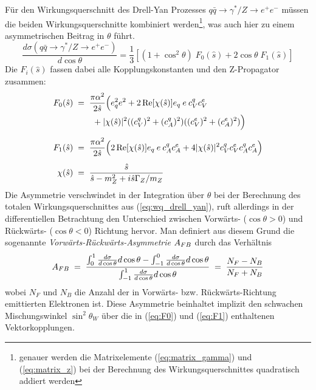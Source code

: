 Für den Wirkungsquerschnitt des Drell-Yan Prozesses $q\bar q \rightarrow
\gamma^*/Z \rightarrow e^+e^-$ müssen die beiden Wirkungsquerschnitte
kombiniert werden\footnote{genauer werden die Matrixelemente
(\ref{eq:matrix_gamma}) und (\ref{eq:matrix_z}) bei der Berechnung des
Wirkungsquerschnittes quadratisch addiert werden}, was auch hier zu einem 
asymmetrischen Beitrag in $\theta$ führt.
\begin{equation}
    \frac{d\sigma(q\bar q\rightarrow\gamma^*/Z\rightarrow e^+e^-)}{d\cos\theta}
        = \frac{1}{3}
          \left[
              (1+\cos^2\theta) \; F_0(\hat s)
              + 2\cos\theta \; F_1(\hat s)
          \right]
    \label{eq:wq_drell_yan}
\end{equation}
Die $F_i(\hat s)$ fassen dabei alle Kopplungskonstanten und den Z-Propagator
zusammen:
\begin{align}
    F_0(\hat s) \; &= \;
        \frac{\pi \alpha^2}{2 \hat s}
        \Bigl(
            e_q^2 e^2 + 2 \operatorname{Re}[\chi(\hat s)] e_q \:e\: c_V^q c_V^e
            \nonumber \\ & \qquad
            + |\chi(\hat s)|^2 ((c_V^q)^2+(c_A^q)^2)((c_V^e)^2+(c_A^e)^2)
        \Bigr)
        \label{eq:F0} \\[5pt]
    F_1(\hat s) \; &= \;
        \frac{\pi \alpha^2}{2 \hat s}
        \Bigl(
            2\operatorname{Re}[\chi(\hat s)] e_q \:e\: c_A^q c_A^e
            + 4|\chi(\hat s)|^2 c_V^q c_V^e c_A^q c_A^e
        \Bigr)
        \label{eq:F1} \\[5pt]
    \chi(\hat s) \; &= \;
        \frac{\hat s}{\hat s - m_Z^2 + i\hat s \Gamma_Z/m_Z}
\end{align}
Die Asymmetrie verschwindet in der Integration über $\theta$ bei der
Berechnung des totalen Wirkungsquerschnittes aus (\ref{eq:wq_drell_yan}), ruft
allerdings in der differentiellen Betrachtung den Unterschied zwischen
Vorwärts- ($\cos\theta > 0$) und Rückwärts- ($\cos\theta < 0$) Richtung hervor. 
Man definiert aus diesem Grund die sogenannte
\textit{Vorwärts-Rückwärts-Asymmetrie} $A_{FB}$ durch das Verhältnis
\begin{equation}
    A_{FB} \;=\; \frac{ \int_0^1    \frac{d\sigma}{d\cos\theta} d\cos\theta
                    - \int_{-1}^0 \frac{d\sigma}{d\cos\theta} d\cos\theta
                    }{\int_{-1}^1 \frac{d\sigma}{d\cos\theta} d\cos\theta}
         \;=\; \frac{N_F - N_B}{N_F + N_B}
    \label{eq:afb}
\end{equation}
wobei $N_F$ und $N_B$ die Anzahl der in Vorwärts- bzw. Rückwärts-Richtung
emittierten Elektronen ist. Diese Asymmetrie beinhaltet implizit den schwachen
Mischungswinkel $\sin^2\theta_W$ über die in (\ref{eq:F0}) und (\ref{eq:F1})
enthaltenen Vektorkopplungen.



